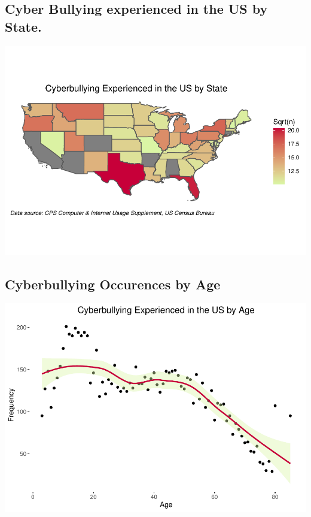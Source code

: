 \documentclass[
  man,LLO-8200, Introduction to Data Science]{apa6}
\begin{document}
\hypertarget{cyber-bullying-experienced-in-the-us-by-state.}{%
\subsection{Cyber Bullying experienced in the US by State.}\label{cyber-bullying-experienced-in-the-us-by-state.}}

\includegraphics{CyberBully_files/figure-latex/CyberbullyByState-1.pdf}

\hypertarget{cyberbullying-occurences-by-age}{%
\subsection{Cyberbullying Occurences by Age}\label{cyberbullying-occurences-by-age}}

\includegraphics{CyberBully_files/figure-latex/DemographicIndicators-1.pdf}
\end{document}
